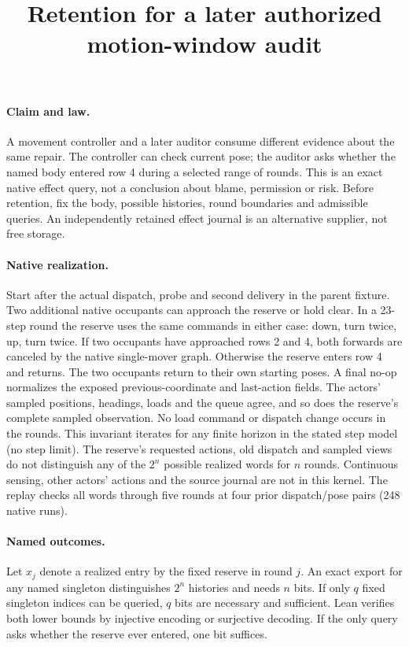 \documentclass{article}
\begin{document}
\title{Retention for a later authorized motion-window audit}
\maketitle

\paragraph{Claim and law.}
A movement controller and a later auditor consume different evidence about
the same repair. The controller can check current pose; the auditor asks
whether the named body entered row 4 during a selected range of rounds.
This is an exact native effect query, not a conclusion about blame,
permission or risk. Before retention, fix the body, possible histories,
round boundaries and admissible queries. An independently retained effect
journal is an alternative supplier, not free storage.

\paragraph{Native realization.}
Start after the actual dispatch, probe and second delivery in the parent
fixture. Two additional native occupants can approach the reserve or hold
clear. In a 23-step round the reserve uses the same commands in either
case: down, turn twice, up, turn twice. If two occupants have approached
rows 2 and 4, both forwards are canceled by the native single-mover graph.
Otherwise the reserve enters row 4 and returns. The two occupants return
to their own starting poses. A final no-op normalizes the exposed
previous-coordinate and last-action fields. The actors' sampled positions,
headings, loads and the queue agree, and so does the reserve's complete
sampled observation. No load command or dispatch change occurs in the
rounds. This invariant iterates for any finite horizon in the stated
step model (no step limit). The reserve's requested actions, old dispatch
and sampled views do not distinguish any of the $2^n$ possible realized
words for $n$ rounds. Continuous sensing, other actors' actions and the
source journal are not in this kernel. The replay checks all words
through five rounds at four prior dispatch/pose pairs (248 native runs).

\paragraph{Named outcomes.}
Let $x_j$ denote a realized entry by the fixed reserve in round $j$.
An exact export for any named singleton distinguishes $2^n$ histories
and needs $n$ bits. If only $q$ fixed singleton indices can be queried,
$q$ bits are necessary and sufficient. Lean verifies both lower bounds
by injective encoding or surjective decoding. If the only query asks
whether the reserve ever entered, one bit suffices.
\end{document}
